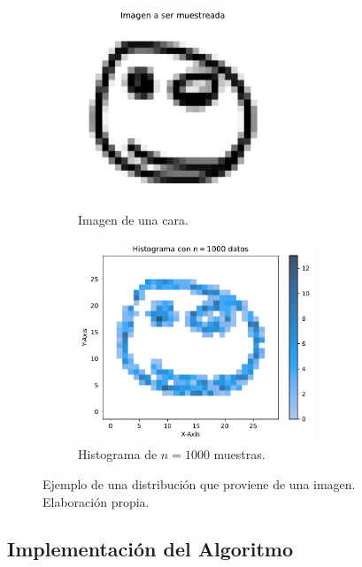 \begin{figure}[htbp]
    \centering
    \begin{subfigure}[b]{0.45\textwidth}
        \centering
        \includegraphics[height=6cm]{img/distr_draw/face_distrib.pdf}
        \caption{Imagen de una cara.}
        \label{fig:face-distrib}
    \end{subfigure}
    \hfill
    \begin{subfigure}[b]{0.45\textwidth}
        \centering
        \includegraphics[height=6cm]{img/distr_draw/face_hist.pdf}
        \caption{Histograma de $n=1000$ muestras.}
        \label{fig:face-hist}
    \end{subfigure}
    \caption{Ejemplo de una distribución que proviene de una imagen. Elaboración propia.}
    \label{fig:face-example}
\end{figure}

\subsection{Implementación del Algoritmo}\label{ssec:implementacion-algoritmo}  %

